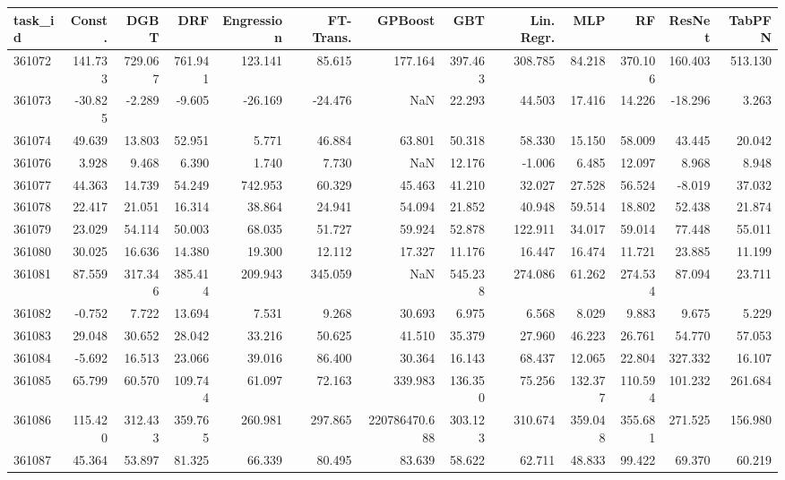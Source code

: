 \begin{tabular}{lrrrrrrrrrrrr}
\toprule
task\_id & Const. & DGBT & DRF & Engression & FT-Trans. & GPBoost & GBT & Lin. Regr. & MLP & RF & ResNet & TabPFN \\
\midrule
361072 & 141.733 & 729.067 & 761.941 & 123.141 & 85.615 & 177.164 & 397.463 & 308.785 & 84.218 & 370.106 & 160.403 & 513.130 \\
361073 & -30.825 & -2.289 & -9.605 & -26.169 & -24.476 & NaN & 22.293 & 44.503 & 17.416 & 14.226 & -18.296 & 3.263 \\
361074 & 49.639 & 13.803 & 52.951 & 5.771 & 46.884 & 63.801 & 50.318 & 58.330 & 15.150 & 58.009 & 43.445 & 20.042 \\
361076 & 3.928 & 9.468 & 6.390 & 1.740 & 7.730 & NaN & 12.176 & -1.006 & 6.485 & 12.097 & 8.968 & 8.948 \\
361077 & 44.363 & 14.739 & 54.249 & 742.953 & 60.329 & 45.463 & 41.210 & 32.027 & 27.528 & 56.524 & -8.019 & 37.032 \\
361078 & 22.417 & 21.051 & 16.314 & 38.864 & 24.941 & 54.094 & 21.852 & 40.948 & 59.514 & 18.802 & 52.438 & 21.874 \\
361079 & 23.029 & 54.114 & 50.003 & 68.035 & 51.727 & 59.924 & 52.878 & 122.911 & 34.017 & 59.014 & 77.448 & 55.011 \\
361080 & 30.025 & 16.636 & 14.380 & 19.300 & 12.112 & 17.327 & 11.176 & 16.447 & 16.474 & 11.721 & 23.885 & 11.199 \\
361081 & 87.559 & 317.346 & 385.414 & 209.943 & 345.059 & NaN & 545.238 & 274.086 & 61.262 & 274.534 & 87.094 & 23.711 \\
361082 & -0.752 & 7.722 & 13.694 & 7.531 & 9.268 & 30.693 & 6.975 & 6.568 & 8.029 & 9.883 & 9.675 & 5.229 \\
361083 & 29.048 & 30.652 & 28.042 & 33.216 & 50.625 & 41.510 & 35.379 & 27.960 & 46.223 & 26.761 & 54.770 & 57.053 \\
361084 & -5.692 & 16.513 & 23.066 & 39.016 & 86.400 & 30.364 & 16.143 & 68.437 & 12.065 & 22.804 & 327.332 & 16.107 \\
361085 & 65.799 & 60.570 & 109.744 & 61.097 & 72.163 & 339.983 & 136.350 & 75.256 & 132.377 & 110.594 & 101.232 & 261.684 \\
361086 & 115.420 & 312.433 & 359.765 & 260.981 & 297.865 & 220786470.688 & 303.123 & 310.674 & 359.048 & 355.681 & 271.525 & 156.980 \\
361087 & 45.364 & 53.897 & 81.325 & 66.339 & 80.495 & 83.639 & 58.622 & 62.711 & 48.833 & 99.422 & 69.370 & 60.219 \\

\end{tabular}
